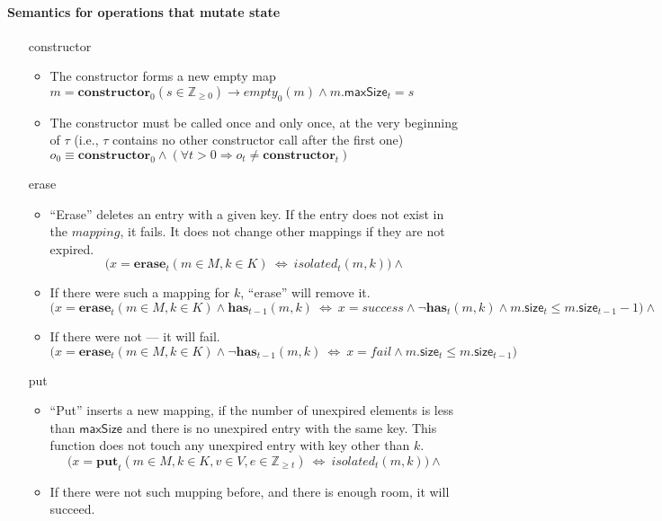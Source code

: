 \documentclass{article}
\renewcommand{\o}[1]{\ensuremath{\mathbf{#1}}}
\newcommand{\p}[1]{\ensuremath{\mathit{#1}}}
\newcommand{\s}[1]{\ensuremath{\mathsf{#1}}}
\newcommand{\nintset}{\ensuremath{\mathds{Z}_{\ge 0}}}
\newcommand{\moreset}[1]{\ensuremath{\mathds{Z}_{\ge #1}}}
\begin{document}
\paragraph{Semantics for operations that mutate state}
\begin{itemize}
  \item[constructor]
    \begin{itemize}
      \item The constructor forms a new empty map \\
        $m=\o{constructor}_0(s \in \nintset) \rightarrow \p{empty}_0(m) \wedge m.\s{maxSize}_t=s$
      \item The constructor must be called once and only once, at the very beginning of $\tau$ (i.e., $\tau$ contains no other constructor call after the first one) \\
        $o_0 \equiv \o{constructor}_0 \wedge (\forall t>0 \Rightarrow o_t \neq \o{constructor}_t)$ 
    \end{itemize}
  \item[erase]
    \begin{itemize}
      \item ``Erase'' deletes an entry with a given key. If the entry does not exist in the \p{mapping}, it fails. It does not change other mappings if they are not expired.
        $$\Big(x=\o{erase}_t(m\in M, k\in K) ~\Leftrightarrow~ \p{isolated}_t(m, k)\Big) \wedge$$
      \item If there were such a mapping for $k$, ``erase'' will remove it.
        $$\Big(x=\o{erase}_t(m\in M, k\in K) \wedge \o{has}_{t-1}(m, k) ~\Leftrightarrow~ x=success \wedge \neg\o{has}_t(m, k) \wedge m.\s{size}_t \le m.\s{size}_{t-1}-1 \Big) \wedge$$
      \item If there were not --- it will fail. 
        $$\Big(x=\o{erase}_t(m\in M, k\in K) \wedge \neg\o{has}_{t-1}(m, k) ~\Leftrightarrow~ x=fail\wedge m.\s{size}_t \le m.\s{size}_{t-1}\Big)$$
    \end{itemize}
    \item[put]
      \begin{itemize}
        \item ``Put'' inserts a new mapping, if the number of unexpired elements is less than \s{maxSize} and there is no unexpired entry with the same key.
          This function does not touch any unexpired entry with key other than $k$.
          $$\Big(x=\o{put}_t(m\in M, k\in K, v\in V, e\in \moreset{t}) ~\Leftrightarrow~ \p{isolated}_t(m, k)\Big) \wedge$$
        \item If there were not such mupping before, and there is enough room, it will succeed.

\end{itemize}
\end{itemize}
\end{document}
